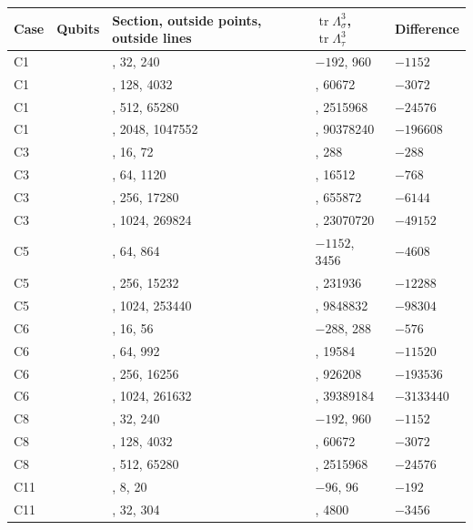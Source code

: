 \documentclass[11pt,a4paper]{article}
\begin{document}
{\def\LTcaptype{none} %
{\small
\begin{longtable}[]{@{}>{\raggedright\arraybackslash}p{}>{\raggedright\arraybackslash}p{}>{\raggedright\arraybackslash}p{}>{\raggedright\arraybackslash}p{}>{\raggedright\arraybackslash}p{}@{}}
\toprule\noalign{}
Case & Qubits & Section, outside points, outside lines & \(\operatorname{tr}\Lambda_\sigma^3\), \(\operatorname{tr}\Lambda_\tau^3\) & Difference \\
\midrule\noalign{}
\endhead
\bottomrule\noalign{}
\endlastfoot
C1 & 3 & 31, 32, 240 & \(-192\), 960 & \(-1152\) \\
C1 & 4 & 127, 128, 4032 & 57600, 60672 & \(-3072\) \\
C1 & 5 & 511, 512, 65280 & 2491392, 2515968 & \(-24576\) \\
C1 & 6 & 2047, 2048, 1047552 & 90181632, 90378240 & \(-196608\) \\
C3 & 3 & 19, 16, 72 & 0, 288 & \(-288\) \\
C3 & 4 & 71, 64, 1120 & 15744, 16512 & \(-768\) \\
C3 & 5 & 271, 256, 17280 & 649728, 655872 & \(-6144\) \\
C3 & 6 & 1055, 1024, 269824 & 23021568, 23070720 & \(-49152\) \\
C5 & 4 & 55, 64, 864 & \(-1152\), 3456 & \(-4608\) \\
C5 & 5 & 239, 256, 15232 & 219648, 231936 & \(-12288\) \\
C5 & 6 & 991, 1024, 253440 & 9750528, 9848832 & \(-98304\) \\
C6 & 3 & 15, 16, 56 & \(-288\), 288 & \(-576\) \\
C6 & 4 & 63, 64, 992 & 8064, 19584 & \(-11520\) \\
C6 & 5 & 255, 256, 16256 & 732672, 926208 & \(-193536\) \\
C6 & 6 & 1023, 1024, 261632 & 36255744, 39389184 & \(-3133440\) \\
C8 & 4 & 31, 32, 240 & \(-192\), 960 & \(-1152\) \\
C8 & 5 & 127, 128, 4032 & 57600, 60672 & \(-3072\) \\
C8 & 6 & 511, 512, 65280 & 2491392, 2515968 & \(-24576\) \\
C11 & 3 & 11, 8, 20 & \(-96\), 96 & \(-192\) \\
C11 & 4 & 39, 32, 304 & 1344, 4800 & \(-3456\) \\

\end{longtable}}}
\end{document}
